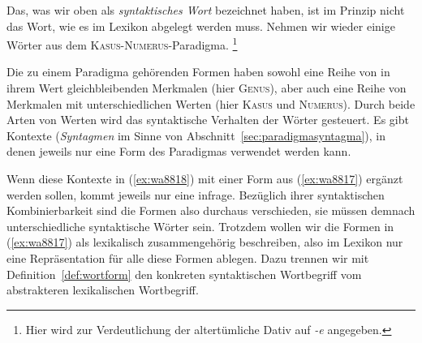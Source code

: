 Das, was wir oben als \textit{syntaktisches Wort} bezeichnet haben, ist im Prinzip nicht das Wort, wie es im Lexikon abgelegt werden muss.
Nehmen wir wieder einige Wörter aus dem \textsc{Kasus}-\textsc{Numerus}-Paradigma.%
\footnote{Hier wird zur Verdeutlichung der altertümliche Dativ auf \textit{-e} angegeben.}

\begin{exe}
  \ex\label{ex:wa8817}
  \begin{xlist}
  \end{xlist}
\end{exe}

Die zu einem Paradigma gehörenden Formen haben sowohl eine Reihe von in ihrem Wert gleichbleibenden Merkmalen (hier \textsc{Genus}), aber auch eine Reihe von Merkmalen mit unterschiedlichen Werten (hier \textsc{Kasus} und \textsc{Numerus}).
Durch beide Arten von Werten wird das syntaktische Verhalten der Wörter gesteuert.
Es gibt Kontexte (\textit{Syntagmen} im Sinne von Abschnitt~\ref{sec:paradigmasyntagma}), in denen jeweils nur eine Form des Paradigmas verwendet werden kann.

\begin{exe}
  \ex\label{ex:wa8818}
  \begin{xlist}
  \end{xlist}
\end{exe}

Wenn diese Kontexte in (\ref{ex:wa8818}) mit einer Form aus (\ref{ex:wa8817}) ergänzt werden sollen, kommt jeweils nur eine infrage.
Bezüglich ihrer syntaktischen Kombinierbarkeit sind die Formen also durchaus verschieden, sie müssen demnach unterschiedliche syntaktische Wörter sein. 
Trotzdem wollen wir die Formen in (\ref{ex:wa8817}) als lexikalisch zusammengehörig beschreiben, also im Lexikon nur eine Repräsentation für alle diese Formen ablegen.
Dazu trennen wir mit Definition~\ref{def:wortform} den konkreten syntaktischen Wortbegriff vom abstrakteren lexikalischen Wortbegriff.

